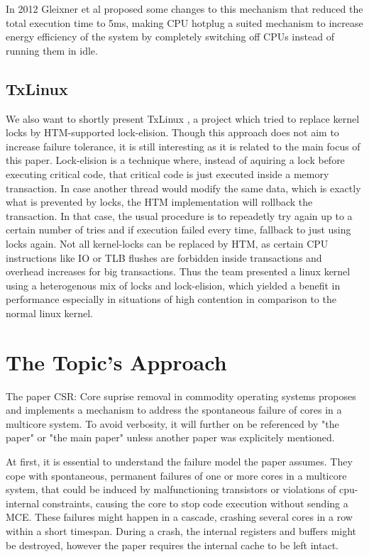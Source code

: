 \documentclass[a4paper,10pt,twoside]{article}
\begin{document}
In 2012 Gleixner et al proposed some changes \cite{Efficient_Hotplug} to this mechanism that reduced the total execution time to 5ms, making CPU hotplug a suited mechanism to increase energy efficiency of the system by completely switching off CPUs instead of running them in idle.

\subsection{TxLinux}
We also want to shortly present TxLinux \cite{TxLinux}, a project which tried to replace kernel locks by HTM-supported lock-elision. Though this approach does not aim to increase failure tolerance, it is still interesting as it is related to the main focus of this paper. Lock-elision is a technique where, instead of aquiring a lock before executing critical code, that critical code is just executed inside a memory transaction. In case another thread would modify the same data, which is exactly what is prevented by locks, the HTM implementation will rollback the transaction. In that case, the usual procedure is to repeadetly try again up to a certain number of tries and if execution failed every time, fallback to just using locks again. Not all kernel-locks can be replaced by HTM, as certain CPU instructions like IO or TLB flushes are forbidden inside transactions and overhead increases for big transactions. Thus the team presented a linux kernel using a heterogenous mix of locks and lock-elision, which yielded a benefit in performance especially in situations of high contention in comparison to the normal linux kernel. 

\section{The Topic's Approach}
The paper CSR: Core suprise removal in commodity operating systems \cite{CSR} proposes and implements a mechanism to address the spontaneous failure of cores in a multicore system. To avoid verbosity, it will further on be referenced by "the paper" or "the main paper" unless another paper was explicitely mentioned.

At first, it is essential to understand the failure model the paper assumes. They cope with spontaneous, permanent failures of one or more cores in a multicore system, that could be induced by malfunctioning transistors or violations of cpu-internal constraints, causing the core to stop code execution without sending a MCE. These failures might happen in a cascade, crashing several cores in a row within a short timespan. During a crash, the internal registers and buffers might be destroyed, however the paper requires the internal cache to be left intact.
\end{document}
